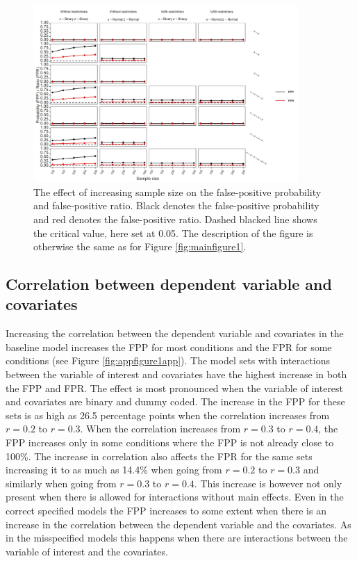 \begin{figure}[hbt!]
\includegraphics[width=0.9\textwidth]{R/Analysis/Result/Figures/Figure1D.jpeg}
\centering
\caption{The effect of increasing sample size on the false-positive probability and false-positive ratio. Black denotes the false-positive probability and red denotes the false-positive ratio. Dashed blacked line shows the critical value, here set at 0.05. The description of the figure is otherwise the same as for Figure \ref{fig:mainfigure1}.}
\label{fig:mainfigure4}
\end{figure}

\subsection{Correlation between dependent variable and covariates}
Increasing the correlation between the dependent variable and  covariates in the baseline model increases the FPP for most conditions and the FPR for some conditions (see Figure \ref{fig:appfigure1app}). The model sets with interactions between the variable of interest and covariates have the highest increase in both the FPP and FPR. The effect is most pronounced when the variable of interest and covariates are binary and dummy coded. The increase in the FPP for these sets is as high as 26.5 percentage points when the correlation increases from $r=0.2$ to $r=0.3$. When the correlation increases from $r=0.3$ to $r=0.4$, the FPP increases only in some conditions where the FPP is not already close to 100\%. The increase in correlation also affects the FPR for the same sets increasing it to as much as 14.4\% when going from $r=0.2$ to $r=0.3$ and similarly when going from $r=0.3$ to $r=0.4$. This increase is however not only present when there is allowed for interactions without main effects. Even in the correct specified models the FPP increases to some extent when there is an increase in the correlation between the dependent variable and the covariates. As in the misspecified models this happens when there are interactions between the variable of interest and the covariates. 